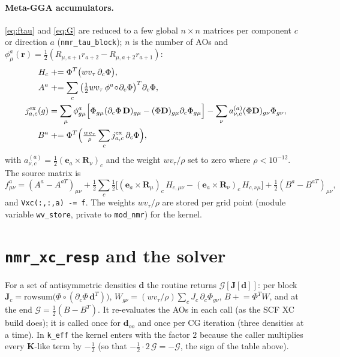 \documentclass[11pt,a4paper]{article}
\newcommand{\rr}{\bm{r}}
\newcommand{\vt}{v_\tau}
\newcommand{\Dm}{\mathbf{D}}
\begin{document}
\paragraph{Meta-GGA accumulators.} \eqref{eq:ftau} and \eqref{eq:G} are reduced to a few global $n\times n$ matrices per component $c$ or direction $a$ (\texttt{nmr\_tau\_block}); $n$ is the number of AOs and $\phi^a_\mu(\rr)=\tfrac12(R_{\mu,a+1}r_{a+2}-R_{\mu,a+2}r_{a+1})$:
\begin{align}
H_{c}&\mathrel{+}=\Phi^T\big(w\vt\,\partial_c\Phi\big), \\
A^a&\mathrel{+}=\sum_c\big(\tfrac12w\vt\,\phi^a\!\circ\!\partial_c\Phi\big)^T\partial_c\Phi,\\
j^{\rm ex}_{a,c}(g)&=\sum_\mu\phi^a_{g\mu}\Big[\Phi_{g\mu}(\partial_c\Phi\,\Dm)_{g\mu}-(\Phi\Dm)_{g\mu}\partial_c\Phi_{g\mu}\Big]-\sum_\nu a^{(a)}_{\nu,c}(\Phi\Dm)_{g\nu}\Phi_{g\nu},\\
B^a&\mathrel{+}=\Phi^T\Big(\tfrac{w\vt}{\rho}\sum_cj^{\rm ex}_{a,c}\,\partial_c\Phi\Big),
\end{align}
with $a^{(a)}_{\nu,c}=\tfrac12(\bm e_a\times\bm R_\nu)_c$ and the weight $w\vt/\rho$ set to zero where $\rho<10^{-12}$. The source matrix is
\begin{equation}
f^{a}_{\mu\nu}=(A^a-A^{aT})_{\mu\nu}+\tfrac12\sum_{c}\tfrac12\big[(\bm e_a\times\bm R_\mu)_c\,H_{c,\mu\nu}-(\bm e_a\times\bm R_\nu)_c\,H_{c,\nu\mu}\big]+\tfrac12(B^a-B^{aT})_{\mu\nu},
\end{equation}
and \texttt{Vxc(:,:,a) -= f}. The weights $w\vt/\rho$ are stored per grid point (module variable \texttt{wv\_store}, private to \texttt{mod\_nmr}) for the kernel.

\section{\texttt{nmr\_xc\_resp} and the solver}

For a set of antisymmetric densities $\bm d$ the routine returns $\mathcal G[\bm J[\bm d]]$: per block $\bm J_c=\mathrm{rowsum}\big(\Phi\circ(\partial_c\Phi\,\bm d^T)\big)$, $W_{g\nu}=(w\vt/\rho)\sum_cJ_c\,\partial_c\Phi_{g\nu}$, $B\mathrel{+}=\Phi^TW$, and at the end $\mathcal G=\tfrac12(B-B^T)$. It re-evaluates the AOs in each call (as the SCF XC build does); it is called once for $\bm d_{oo}$ and once per CG iteration (three densities at a time). In \texttt{k\_eff} the kernel enters with the factor $2$ because the caller multiplies every $\mathbf K$-like term by $-\tfrac12$ (so that $-\tfrac12\cdot2\,\mathcal G=-\mathcal G$, the sign of the table above).
\end{document}
